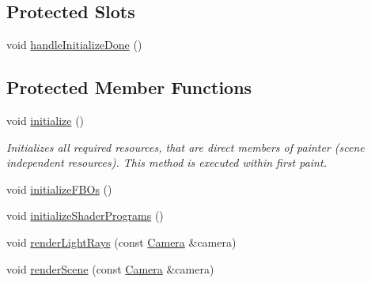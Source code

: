 \subsection*{Protected Slots}
\begin{DoxyCompactItemize}
\item 
void \hyperlink{class_painter_ab5dbc13d3e46ee83c4f819a5ae74206e}{handle\+Initialize\+Done} ()
\end{DoxyCompactItemize}
\subsection*{Protected Member Functions}
\begin{DoxyCompactItemize}
\item 
void \hyperlink{class_painter_a12f9623c2acf87eced6e141e7638804e}{initialize} ()
\begin{DoxyCompactList}\small\item\em Initializes all required resources, that are direct members of painter (scene independent resources). This method is executed within first paint. \end{DoxyCompactList}\item 
void \hyperlink{class_painter_ad7db952528a1d7745dbf083ee1431f50}{initialize\+F\+B\+Os} ()
\item 
void \hyperlink{class_painter_a4fee3b94c00da17f851b52cc8d60ff72}{initialize\+Shader\+Programs} ()
\item 
void \hyperlink{class_painter_a5fee5d930d347b38fe1aa565e3264d3c}{render\+Light\+Rays} (const \hyperlink{class_camera}{Camera} \&camera)
\item 
void \hyperlink{class_painter_a8cbffb0c2d28dd1558716136c99a079f}{render\+Scene} (const \hyperlink{class_camera}{Camera} \&camera)
\end{DoxyCompactItemize}
